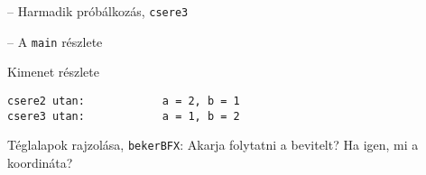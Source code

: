 \documentclass[usenames,dvipsnames,aspectratio=169]{beamer}
\begin{document}
\begin{frame}[fragile]
  \begin{exampleblock}{ -- Harmadik próbálkozás, \texttt{csere3}}
    \vspace{-.2cm}
    \scriptsize
    
    \vspace{-.2cm}
  \end{exampleblock}
  \begin{exampleblock}{ -- A \texttt{main} részlete}
    \vspace{-.2cm}
    \scriptsize
    
    \vspace{-.2cm}
  \end{exampleblock}
  \begin{block}{Kimenet részlete}
    \vspace{-.3cm}
    \scriptsize
    \begin{verbatim}
csere2 utan:            a = 2, b = 1
csere3 utan:            a = 1, b = 2
\end{verbatim}
    \vspace{-.2cm}
  \end{block}
\end{frame}

\begin{frame}
  \footnotesize
  \begin{exampleblock}{ Téglalapok rajzolása, \texttt{bekerBFX}: Akarja folytatni a bevitelt? Ha igen, 
mi a koordináta?}
    \vspace{-.2cm}
    
    \vspace{-.2cm}
  \end{exampleblock}
\end{frame}

\begin{frame}
  \small
  \begin{exampleblock}{}
    \vspace{-.2cm}
    \scriptsize
    
    \vspace{-.2cm}
  \end{exampleblock}
\end{frame}
\end{document}
